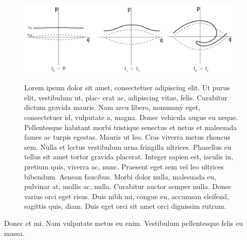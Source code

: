 \begin{figure}
\centering
{\caption{
Lorem ipsum dolor sit amet, consectetuer adipiscing elit. Ut purus elit, vestibulum ut, plac- erat ac, adipiscing vitae, felis. Curabitur dictum gravida mauris. Nam arcu libero, nonummy eget, consectetuer id, vulputate a, magna. Donec vehicula augue eu neque. Pellentesque habitant morbi tristique senectus et netus et malesuada fames ac turpis egestas. Mauris ut leo. Cras viverra metus rhoncus sem. Nulla et lectus vestibulum urna fringilla ultrices. Phasellus eu tellus sit amet tortor gravida placerat. Integer sapien est, iaculis in, pretium quis, viverra ac, nunc. Praesent eget sem vel leo ultrices bibendum. Aenean faucibus. Morbi dolor nulla, malesuada eu, pulvinar at, mollis ac, nulla. Curabitur auctor semper nulla. Donec varius orci eget risus. Duis nibh mi, congue eu, accumsan eleifend, sagittis quis, diam. Duis eget orci sit amet orci dignissim rutrum.}\label{figure4}}
{\hspace{40mm} \includegraphics[width=1\textwidth]{Figs/Fig_cat_eyes_amplified.pdf}}
\end{figure}

\lipsum[4-7]

\begin{theorem}[Lipsum]
Donec et mi. Nam vulputate metus eu enim. Vestibulum pellentesque felis eu massa.
\end{theorem}

